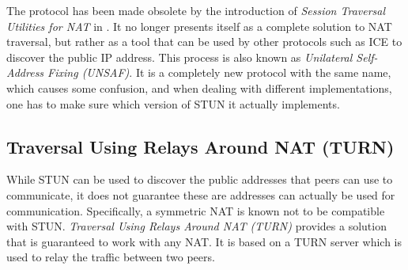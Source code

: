 
The protocol has been made obsolete by the introduction of \textit{Session Traversal Utilities for NAT} in \cite{rfc5389}. It no longer presents itself as a complete solution to NAT traversal, but rather as a tool that can be used by other protocols such as ICE to discover the public IP address. This process is also known as \textit{Unilateral Self-Address Fixing (UNSAF)}. It is a completely new protocol with the same name, which causes some confusion, and when dealing with different implementations, one has to make sure which version of STUN it actually implements.

\subsection{Traversal Using Relays Around NAT (TURN)}

While STUN can be used to discover the public addresses that peers can use to communicate, it does not guarantee these are addresses can actually be used for communication. Specifically, a symmetric NAT is known not to be compatible with STUN. \textit{Traversal Using Relays Around NAT (TURN)} provides a solution that is guaranteed to work with any NAT. It is based on a TURN server which is used to relay the traffic between two peers.

